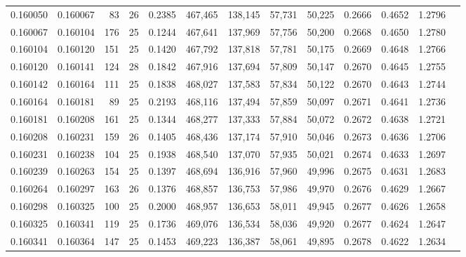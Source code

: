 \begin{tabular}{rrrrrrrrrrrrr}
0.160050 & 0.160067 &  83 &  26 &                                     0.2385 & 467,465 & 138,145 &  57,731 &  50,225 & 0.2666 & 0.4652 & 1.2796 \\
0.160067 & 0.160104 & 176 &  25 &                                     0.1244 & 467,641 & 137,969 &  57,756 &  50,200 & 0.2668 & 0.4650 & 1.2780 \\
0.160104 & 0.160120 & 151 &  25 &                                     0.1420 & 467,792 & 137,818 &  57,781 &  50,175 & 0.2669 & 0.4648 & 1.2766 \\
0.160120 & 0.160141 & 124 &  28 &                                     0.1842 & 467,916 & 137,694 &  57,809 &  50,147 & 0.2670 & 0.4645 & 1.2755 \\
0.160142 & 0.160164 & 111 &  25 &                                     0.1838 & 468,027 & 137,583 &  57,834 &  50,122 & 0.2670 & 0.4643 & 1.2744 \\
0.160164 & 0.160181 &  89 &  25 &                                     0.2193 & 468,116 & 137,494 &  57,859 &  50,097 & 0.2671 & 0.4641 & 1.2736 \\
0.160181 & 0.160208 & 161 &  25 &                                     0.1344 & 468,277 & 137,333 &  57,884 &  50,072 & 0.2672 & 0.4638 & 1.2721 \\
0.160208 & 0.160231 & 159 &  26 &                                     0.1405 & 468,436 & 137,174 &  57,910 &  50,046 & 0.2673 & 0.4636 & 1.2706 \\
0.160231 & 0.160238 & 104 &  25 &                                     0.1938 & 468,540 & 137,070 &  57,935 &  50,021 & 0.2674 & 0.4633 & 1.2697 \\
0.160239 & 0.160263 & 154 &  25 &                                     0.1397 & 468,694 & 136,916 &  57,960 &  49,996 & 0.2675 & 0.4631 & 1.2683 \\
0.160264 & 0.160297 & 163 &  26 &                                     0.1376 & 468,857 & 136,753 &  57,986 &  49,970 & 0.2676 & 0.4629 & 1.2667 \\
0.160298 & 0.160325 & 100 &  25 &                                     0.2000 & 468,957 & 136,653 &  58,011 &  49,945 & 0.2677 & 0.4626 & 1.2658 \\
0.160325 & 0.160341 & 119 &  25 &                                     0.1736 & 469,076 & 136,534 &  58,036 &  49,920 & 0.2677 & 0.4624 & 1.2647 \\
0.160341 & 0.160364 & 147 &  25 &                                     0.1453 & 469,223 & 136,387 &  58,061 &  49,895 & 0.2678 & 0.4622 & 1.2634 \\

\end{tabular}
